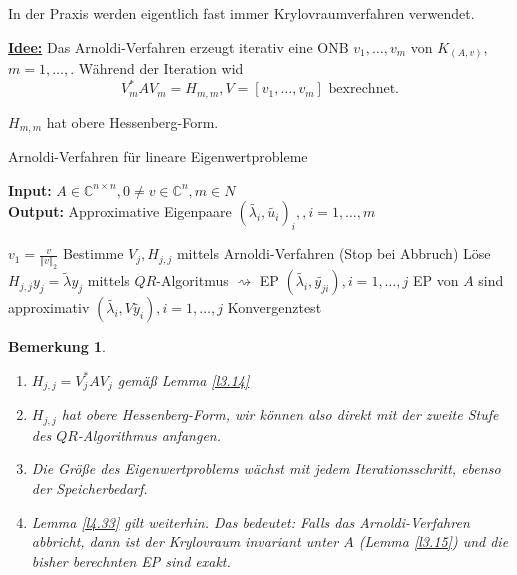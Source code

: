 \documentclass{book}
\newtheorem{remark}[algorithm]{Bemerkung}
\def\C{\mathbb{C}}
\begin{document}
            In der Praxis werden eigentlich fast immer Krylovraumverfahren verwendet.

            \underline{\textbf{Idee:}} Das Arnoldi-Verfahren erzeugt iterativ eine ONB $v_1,\dots,v_m$ von 
            $K_(A,v)$, $m=1,\dots,$. Während der Iteration wid 
            \begin{equation*}
                V_m^*AV_m=H_{m,m}, V=[v_1,\dots,v_m] \text{ bexrechnet.}
            \end{equation*}

            $H_{m,m}$ hat obere Hessenberg-Form.

            \begin{algorithm}[H]
                \caption{Arnoldi-Verfahren für lineare Eigenwertprobleme}\label{a4.35} 
                \textbf{Input:} $A\in\C^{n\times n},0\neq v\in\C^n,m\in N$\\
                \textbf{Output:} Approximative Eigenpaare $(\tilde{\lambda_i},\tilde{u_i})_i,,i=1,\dots,m$
                \begin{algorithmic}
                    \State $v_1=\frac{v}{\left\Vert v \right\Vert_2}$
                        \State Bestimme $V_j,H_{j,j}$ mittels Arnoldi-Verfahren
                        \State (Stop bei Abbruch)
                        \State Löse $H_{j,j}y_j=\tilde{\lambda}y_j$ mittels $QR$-Algoritmus
                        \State $\rightsquigarrow$ EP $(\tilde{\lambda_i},\tilde{y_{ji}}),i=1,\dots,j$
                        \State EP von $A$ sind approximativ $(\tilde{\lambda_i},V\tilde{y_i}),i=1,\dots,j$
                        \State Konvergenztest
                        \EndFor 
                \end{algorithmic}
                \end{algorithm}
            
            \begin{remark}\label{b4.36}
                \begin{enumerate}
                    \item $H_{j,j}=V^*_jAV_j$ gemäß Lemma \ref{l3.14}
                    \item $H_{j,j}$ hat obere Hessenberg-Form, wir können also direkt mit der zweite 
                        Stufe des $QR$-Algorithmus anfangen.
                    \item Die Größe des Eigenwertproblems wächst mit jedem Iterationsschritt, ebenso der Speicherbedarf. 
                    \item Lemma \ref{l4.33} gilt weiterhin. Das bedeutet: Falls das Arnoldi-Verfahren abbricht, dann ist der Krylovraum invariant unter $A$ (Lemma \ref{l3.15}) und die 
                        bisher berechnten EP sind exakt.
                \end{enumerate}
            \end{remark}
\end{document}
